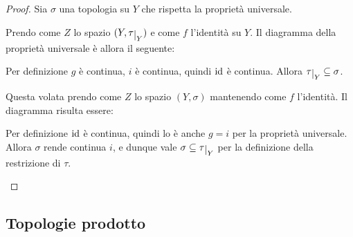 \documentclass{article}
\begin{document}
\begin{proof}
    Sia $\sigma$ una topologia su $Y$ che rispetta la propriet\`a universale.
    \begin{nlist}
        \item Prendo come $Z$ lo spazio $(Y, \tau\restrict{Y})$ e come $f$
        l'identità su $Y$. Il diagramma della proprietà universale \`e allora il
        seguente:

        \begin{center}\end{center}

        Per definizione $g$ \`e continua, $i$ \`e continua, quindi $\operatorname{id}$ \`e
        continua. Allora $\tau\restrict{Y} \subseteq \sigma$.

        \item Questa volata prendo come $Z$ lo spazio $(Y, \sigma)$ mantenendo
        come $f$ l'identità. Il diagramma risulta essere:

        \begin{center}\end{center}

        Per definizione $\operatorname{id}$ \`e continua, quindi lo \`e anche $g=i$ per la
        propriet\`a universale. Allora $\sigma$ rende continua $i$, e dunque
        vale $\sigma \subseteq \tau\restrict{Y}$ per la definizione della
        restrizione di $\tau$.
    \end{nlist}
\end{proof}

\subsection{Topologie prodotto}
\end{document}
